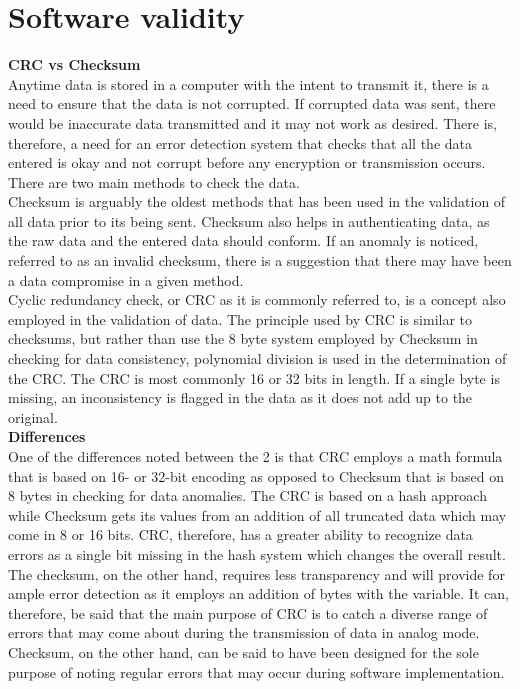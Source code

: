 \section*{Software validity}

\textbf{CRC vs Checksum}\\
Anytime data is stored in a computer with the intent to transmit it, there is a need to ensure that the data is not corrupted. If corrupted data was sent, there would be inaccurate data transmitted and  it may not work as desired. There is, therefore, a need for an error detection system that checks that all the data entered is okay and not corrupt before any encryption or transmission occurs. There are two main methods to check the data.\\
Checksum is arguably the oldest methods that has been used in the validation of all data prior to its being sent. Checksum also helps in authenticating data, as the raw data and the entered data should conform. If an anomaly is noticed, referred to as an invalid checksum, there is a suggestion that there may have been a data compromise in a given method.\\
Cyclic redundancy check, or CRC as it is commonly referred to, is a concept also employed in the validation of data. The principle used by CRC is similar to checksums, but rather than use the 8 byte system employed by Checksum in checking for data consistency, polynomial division is used in the determination of the CRC. The CRC is most commonly 16 or 32 bits in length. If a single byte is missing, an inconsistency is flagged in the data as it does not add up to the original.\\
\textbf{Differences}\\
One of the differences noted between the 2 is that CRC employs a math formula that is based on 16- or 32-bit encoding as opposed to Checksum that is based on 8 bytes in checking for data anomalies. The CRC is based on a hash approach while Checksum gets its values from an addition of all truncated data which may come in 8 or 16 bits. CRC, therefore, has a greater ability to recognize data errors as a single bit missing in the hash system which changes the overall result.\\
The checksum, on the other hand, requires less transparency and will provide for ample error detection as it employs an addition of bytes with the variable. It can, therefore, be said that the main purpose of CRC is to catch a diverse range of errors that may come about during the transmission of data in analog mode. Checksum, on the other hand, can be said to have been designed for the sole purpose of noting regular errors that may occur during software implementation.\\
